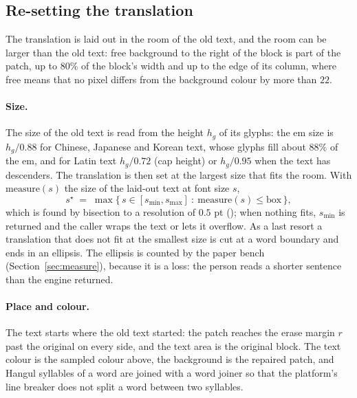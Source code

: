 \subsection{Re-setting the translation}

The translation is laid out in the room of the old text, and the room can be larger than the old text: free background to the
right of the block is part of the patch, up to $80\%$ of the block's width and up to the edge of its column, where free means
that no pixel differs from the background colour by more than $22$.

\paragraph{Size.}
The size of the old text is read from the height $h_g$ of its glyphs: the em size is $h_g/0.88$ for Chinese, Japanese and
Korean text, whose glyphs fill about $88\%$ of the em, and for Latin text $h_g/0.72$ (cap height) or $h_g/0.95$ when the text has
descenders. The translation is then set at the largest size that fits the room. With $\mathrm{measure}(s)$ the size of the laid-out
text at font size $s$,
\begin{equation}\label{eq:fit}
s^\star\;=\;\max\bigl\{\,s\in[s_{\min},s_{\max}]\ :\ \mathrm{measure}(s)\le\mathrm{box}\,\bigr\},
\end{equation}
which is found by bisection to a resolution of $0.5$ pt (); when nothing fits, $s_{\min}$ is returned and
the caller wraps the text or lets it overflow. As a last resort a translation that does not fit at the smallest size is cut at a
word boundary and ends in an ellipsis. The ellipsis is counted by the paper bench (Section~\ref{sec:measure}), because it is a
loss: the person reads a shorter sentence than the engine returned.

\paragraph{Place and colour.}
The text starts where the old text started: the patch reaches the erase margin $r$ past the original on every side, and the text
area is the original block. The text colour is the sampled colour above, the background is the repaired patch, and Hangul syllables
of a word are joined with a word joiner so that the platform's line breaker does not split a word between two syllables.

